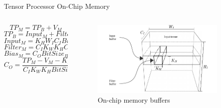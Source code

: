 \begin{frame}{Tensor Processor On-Chip Memory}
	\begin{columns}[c] %
		\begin{column}{0.5\textwidth}
			
			\vspace{1mm}
			\begin{equation}
			TP_{M}=TP_B+V_{M}
			\end{equation}
			\vspace{1mm} 
			\begin{equation}
			TP_{B}=Input_{M}+Filter_{M}+Bias_{M}
			\end{equation}
			\vspace{1mm} 
			\begin{equation}
			Input_{M}=K_{H}W_{I}C_{I}BitSize_{I}
			\end{equation}
			\vspace{1mm} 
			\begin{equation}
			Filter_{M}=C_{I}K_{W}K_{H}C_{O}BitSize_{F}
			\end{equation}
			\vspace{1mm} 
			\begin{equation}
			Bias_{M}=C_{O}BitSize_{B}
			\end{equation}
			\vspace{1mm} 
			\begin{equation}
			C_{O}=\frac{TP_{M}-V_{M}-K_{H}W_{I}C_{I}BitSize_{I}}{C_{I}K_{W}K_{H}BitSize_{F}+BitSize_{B}}
			\end{equation}
		\end{column}
		
		\begin{column}{0.5\textwidth}
			\begin{figure}
				\centering
				\includegraphics[width=0.9\textwidth]{../chapters/cnn_accelerator/figures/accelerator_buffers.pdf} %
				\caption{ On-chip memory buffers}
			\end{figure}
		\end{column}
	\end{columns}
\end{frame}


